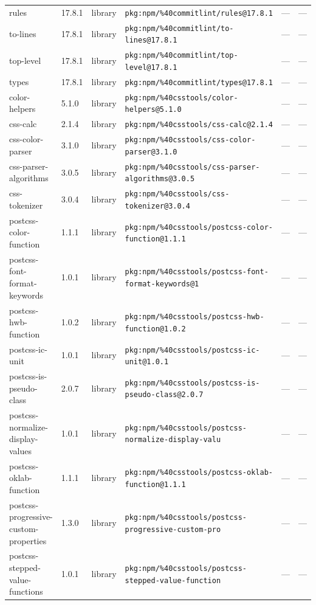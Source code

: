 \documentclass[11pt]{article}
\begin{document}
\begin{longtable}{|l|l|l|p{2.2cm}|l|p{4cm}|}
rules & 17.8.1 & library & \texttt{pkg:npm/\%40commitlint/rules@17.8.1} & — & — \\
to-lines & 17.8.1 & library & \texttt{pkg:npm/\%40commitlint/to-lines@17.8.1} & — & — \\
top-level & 17.8.1 & library & \texttt{pkg:npm/\%40commitlint/top-level@17.8.1} & — & — \\
types & 17.8.1 & library & \texttt{pkg:npm/\%40commitlint/types@17.8.1} & — & — \\
color-helpers & 5.1.0 & library & \texttt{pkg:npm/\%40csstools/color-helpers@5.1.0} & — & — \\
css-calc & 2.1.4 & library & \texttt{pkg:npm/\%40csstools/css-calc@2.1.4} & — & — \\
css-color-parser & 3.1.0 & library & \texttt{pkg:npm/\%40csstools/css-color-parser@3.1.0} & — & — \\
css-parser-algorithms & 3.0.5 & library & \texttt{pkg:npm/\%40csstools/css-parser-algorithms@3.0.5} & — & — \\
css-tokenizer & 3.0.4 & library & \texttt{pkg:npm/\%40csstools/css-tokenizer@3.0.4} & — & — \\
postcss-color-function & 1.1.1 & library & \texttt{pkg:npm/\%40csstools/postcss-color-function@1.1.1} & — & — \\
postcss-font-format-keywords & 1.0.1 & library & \texttt{pkg:npm/\%40csstools/postcss-font-format-keywords@1} & — & — \\
postcss-hwb-function & 1.0.2 & library & \texttt{pkg:npm/\%40csstools/postcss-hwb-function@1.0.2} & — & — \\
postcss-ic-unit & 1.0.1 & library & \texttt{pkg:npm/\%40csstools/postcss-ic-unit@1.0.1} & — & — \\
postcss-is-pseudo-class & 2.0.7 & library & \texttt{pkg:npm/\%40csstools/postcss-is-pseudo-class@2.0.7} & — & — \\
postcss-normalize-display-values & 1.0.1 & library & \texttt{pkg:npm/\%40csstools/postcss-normalize-display-valu} & — & — \\
postcss-oklab-function & 1.1.1 & library & \texttt{pkg:npm/\%40csstools/postcss-oklab-function@1.1.1} & — & — \\
postcss-progressive-custom-properties & 1.3.0 & library & \texttt{pkg:npm/\%40csstools/postcss-progressive-custom-pro} & — & — \\
postcss-stepped-value-functions & 1.0.1 & library & \texttt{pkg:npm/\%40csstools/postcss-stepped-value-function} & — & — \\

\end{longtable}
\end{document}
